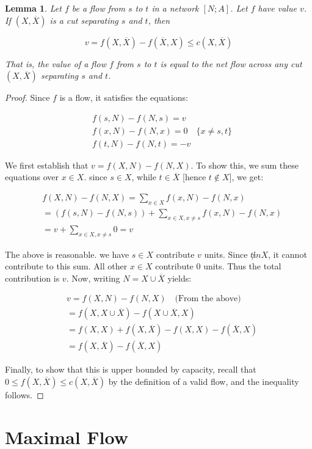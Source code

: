\documentclass[titlepage]{article}
\newcommand{\Xbar}{\ensuremath{\overline{X}}}
\theoremstyle{plain}
\newtheorem{lemma}{Lemma}[theorem]
\theoremstyle{definition}
\theoremstyle{remark}
\begin{document}
\begin{lemma}
    Let $f$ be a flow from $s$ to $t$ in a network $[N; A]$. Let $f$ have
    value $v$. If $(X, \Xbar)$ is a cut separating $s$ and $t$, then

\begin{equation}
    \tag{Flow-Cut equality}
    v = f(X, \Xbar) - f(\Xbar, X) \leq c(X, \Xbar) 
    \label{eqn:flow-cut-equality}
\end{equation}

That is, the value of a flow $f$ from $s$ to $t$ is equal to the net flow
across any cut $(X, \Xbar)$ separating $s$ and $t$.
\end{lemma}
\begin{proof}
Since $f$ is a flow, it satisfies the equations:

\begin{align*}
    &f(s, N) - f(N, s) = v \\
    &f(x, N) - f(N, x) = 0 \quad \{x \neq s, t\} \\
    &f(t, N) - f(N, t) = -v
\end{align*}

We first establish that $v = f(X, N) - f(N, X)$. To show this, we sum these
equations over $x \in X$. since $s \in X$, while $t \in \Xbar$ [hence $t \not \in X]$, we get:

\begin{align*}
    &f(X, N) - f(N, X) = \sum_{x \in X} f(x, N) - f(N, x)\\
    &= (f(s, N) - f(N, s)) + \sum_{x \in X, x \neq s} f(x, N) - f(N, x) \\
    &= v + \sum_{x \in X, x \neq s} 0 = v
\end{align*}

The above is reasonable. we have $s \in X$ contribute $v$ units. 
Since $t \not in X$, it cannot contribute to this sum. All other
$x \in X$ contribute $0$ units. Thus the total contribution is $v$.  Now, writing $N = X \cup \Xbar$ yields:

\begin{align*}
&v = f(X, N) - f(N, X) \quad \text{(From the above)} \\
&= f(X, X \cup \Xbar) - f(X \cup \Xbar, X) \\
&= f(X, X) + f(X, \Xbar) - f(X, X) - f(\Xbar, X) \\
&= f(X, \Xbar) - f(\Xbar, X)
\end{align*}

Finally, to show that this is upper bounded by capacity, recall that $0 \leq f(X, \Xbar) \leq c(X, \Xbar)$
by the definition of a valid flow, and the inequality follows.

\end{proof}

\section{Maximal Flow}




\nocite{*}
\end{document}
